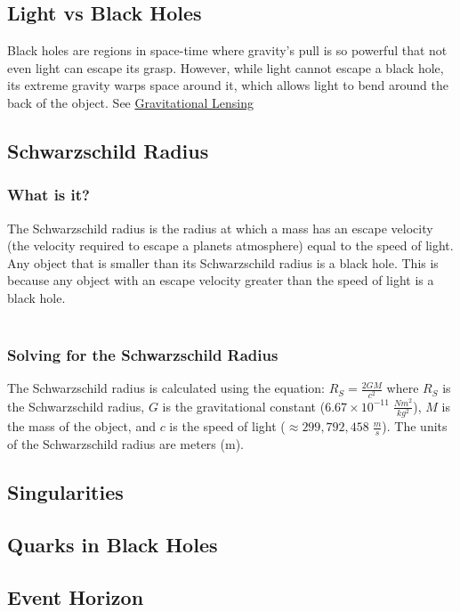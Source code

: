 \documentclass{article}
\begin{document}
\subsection{Light vs Black Holes}
Black holes are regions in space-time where gravity's pull is so powerful that not even light can escape its grasp. However, while light cannot escape a black hole, its extreme gravity warps space around it, which allows light to bend around the back of the object. See \hyperref[sec:gravitational_lensing]{Gravitational Lensing}

\subsection{Schwarzschild Radius}
\subsubsection{What is it?}
The Schwarzschild radius is the radius at which a mass has an escape velocity (the velocity required to escape a planets atmosphere) equal to the speed of light. Any object that is smaller than its Schwarzschild radius is a black hole. This is because any object with an escape velocity greater than the speed of light is a black hole.\\\\

\subsubsection{Solving for the Schwarzschild Radius}
The Schwarzschild radius is calculated using the equation: $R_{S} = \frac{2GM}{c^2}$ where $R_{S}$ is the Schwarzschild radius, $G$ is the gravitational constant (\hyperref[sec:constants]{$6.67 \times 10^{-11}\;\frac{Nm^2}{kg^2}$}), $M$ is the mass of the object, and $c$ is the speed of light (\hyperref[sec:constants]{$\approx 299, 792, 458\;\frac{m}{s}$}). The units of the Schwarzschild radius are meters (m).

\subsection{Singularities}


\subsection{Quarks in Black Holes}


\subsection{Event Horizon}
\end{document}
